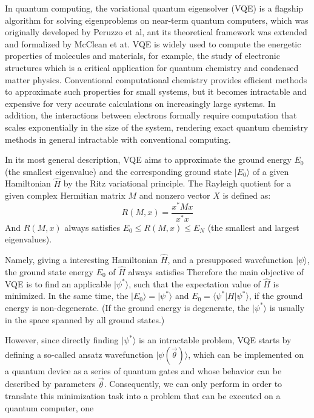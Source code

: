 In quantum computing, the variational quantum eigensolver (VQE) is a flagship algorithm for solving eigenproblems on near-term quantum computers, which was originally developed by Peruzzo et al, ant its theoretical framework was extended and formalized by McClean et at.
VQE is widely used to compute the energetic properties of molecules and materials, for example, the study of electronic structures which is a critical application for quantum chemistry and condensed matter physics. 
Conventional computational chemistry provides efficient methods to approximate such properties for small systems, but it becomes intractable and expensive for very accurate calculations on increasingly large systems. In addition, the interactions between electrons formally require computation that scales exponentially in the size of the system, rendering exact quantum chemistry methods in general intractable with conventional computing.

In its most general description, VQE aims to approximate the ground energy $E_0$ (the smallest eigenvalue) and the corresponding ground state $|E_0\rangle$ of a given Hamiltonian $\hat{H}$ by the Ritz variational principle.
The Rayleigh quotient for a given complex Hermitian matrix $M$ and nonzero vector $X$ is defined as:
\begin{equation}
    R(M,x)=\frac{x^*Mx}{x^*x}
\end{equation}
And $R(M,x)$ always satisfies $E_0\leq R(M,x)\leq E_N$ (the smallest and largest eigenvalues).


Namely, giving a interesting Hamiltonian $\hat{H}$, and a presupposed wavefunction $|\psi\rangle$, the ground state energy $E_{0}$ of $\hat{H}$ always satisfies
Therefore the main objective of VQE is to find an applicable $|\psi^*\rangle$, such that the expectation value of $\hat{H}$ is minimized. In the same time, the $|E_0\rangle = |\psi^*\rangle$ and $E_0 = \langle \psi^* |H| \psi^* \rangle$, if the ground energy is non-degenerate. (If the ground energy is degenerate, the $|\psi^*\rangle$ is usually in the space spanned by all ground states.)

However, since directly finding $|\psi^*\rangle$ is an intractable problem, VQE starts by defining a so-called ansatz wavefunction $|\psi(\vec{\theta})\rangle$, which can be implemented on a quantum device as a series of quantum gates and whose behavior can be described by parameters $\vec{\theta}$.
Consequently, we can only perform in order to translate this minimization task into a problem that can be executed on a quantum computer, one 

